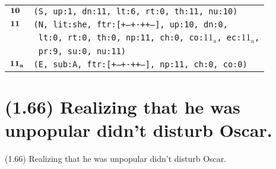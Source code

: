 \documentclass{article}
\begin{document}
\begin{minipage}{\textwidth}
{\begin{tabular}{|r|l|}
    ${\textbf{\textrm{10}}_{\phantom{z}}}$ & \texttt{\texttt{(S,~up:1,~dn:11,~lt:6,~rt:0,~th:11,~nu:10)}} \\
    ${\textbf{\textrm{11}}_{\phantom{z}}}$ & \texttt{\texttt{(N,~lit:she,~ftr:[+--+-++--],~up:10,~dn:0,}} \\
    & \texttt{\texttt{~lt:0,~rt:0,~th:0,~np:11,~ch:0,~co:${\textrm{11}_{\textrm{a}}}$,~ec:${\textrm{11}_{\textrm{a}}}$,}} \\
    & \texttt{\texttt{~pr:9,~su:0,~nu:11)}} \\
    ${\textbf{\textrm{11}}_{\textbf{\textrm{a}}}}$ & \texttt{\texttt{(E,~sub:A,~ftr:[+--+-++--],~np:11,~ch:0,~co:0)}} \\
    \hline
  \end{tabular}
  }
\end{minipage}
\bigbreak

\clearpage

%
%

\section*{(1.66) Realizing that he was unpopular didn't disturb Oscar.}

\bigbreak
\begin{enumerate*}
\item[(1.66)] Realizing that he was unpopular didn't disturb Oscar.
\end{enumerate*}
\bigbreak
\end{document}
